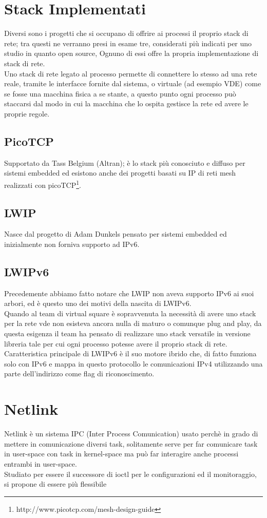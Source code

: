 \section{Stack Implementati}
Diversi sono i progetti che si occupano di offrire ai processi il proprio stack di rete; tra questi ne verranno presi in esame tre, considerati pi\`u indicati per uno studio in quanto open source, Ognuno di essi offre la propria implementazione di stack di rete.\\
Uno stack di rete legato al processo permette di connettere lo stesso ad una rete reale, tramite le interfacce fornite dal sistema, o virtuale (ad esempio VDE) come se fosse una macchina fisica a se stante, a questo punto ogni processo pu\`o staccarsi dal modo in cui la macchina che lo ospita gestisce la rete ed avere le proprie regole.\\

\subsection{PicoTCP}
Supportato da Tass Belgium (Altran); \`e lo stack pi\`u conosciuto e diffuso per sistemi embedded ed esistono anche dei progetti basati su IP di reti mesh realizzati con picoTCP\footnote{http://www.picotcp.com/mesh-design-guide}.
\subsection{LWIP}
Nasce dal progetto di Adam Dunkels pensato per sistemi embedded ed inizialmente non forniva supporto ad IPv6.
\subsection{LWIPv6}
Precedemente abbiamo fatto notare che LWIP non aveva supporto IPv6 ai suoi arbori, ed è questo uno dei motivi della nascita di LWIPv6.\\
Quando al team di virtual square \`e sopravvenuta la necessit\`a di avere uno stack per la rete vde non esisteva ancora nulla di maturo o comunque plug and play, da questa esigenza il team ha pensato di realizzare uno stack versatile in versione libreria tale per cui ogni processo potesse avere il proprio stack di rete.\\
Caratteristica principale di LWIPv6 \`e il suo motore ibrido che, di fatto funziona solo con IPv6 e mappa in questo protocollo le comunicazioni IPv4 utilizzando una parte dell'indirizzo come flag di riconoscimento.
\section{Netlink}
Netlink \`e un sistema IPC (Inter Process Comunication) usato perch\`e in grado di mettere in comunicazione diversi task, solitamente serve per far comunicare task in user-space con task in kernel-space ma pu\`o far interagire anche processi entrambi in user-space.\\
Studiato per essere il successore di ioctl per le configurazioni ed il monitoraggio, si propone di essere pi\`u flessibile
